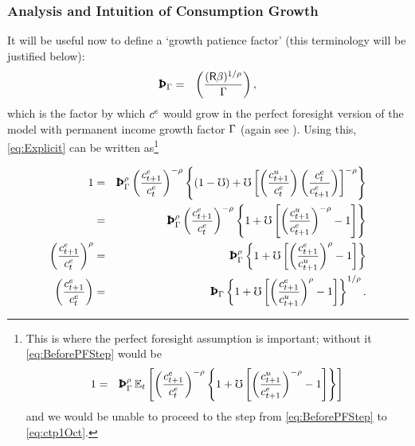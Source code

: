 \documentclass{handout}
\begin{document}
\subsubsection{Analysis and Intuition of Consumption Growth}
It will be useful now to define a `growth patience factor' (this terminology will be justified below):
\begin{eqnarray}
  \PatPGro & = & \left(\frac{(\Rfree\Discount)^{1/\CRRA}}{\PGro}\right), \label{eq:PatPGro}
\end{eqnarray}
which is the factor by which $c^{e}$ would grow in the
perfect foresight version of the model with permanent income growth factor
$\Gamma$ (again see ).  
Using this,
\eqref{eq:Explicit} can be written as\footnote{This is where the perfect foresight assumption is important; without it \eqref{eq:BeforePFStep} would be 
\begin{eqnarray}
 1       & = & \PatPGro^{\CRRA} \Ex_{t}\left[\left(\frac{\cRatE_{t+1}}{\cRatE_{t}}\right)^{-\CRRA} \left\{1+\urate\left[\left(\frac{\cU_{t+1}}{\cRatE_{t+1}}\right)^{-\CRRA}-1\right]\right\}\right] \label{eq:BeforePFStepWithEx}
\end{eqnarray}
and we would be unable to proceed to the step from \eqref{eq:BeforePFStep} to \eqref{eq:ctp1Oct}.}

\begin{eqnarray}
        1  & = & \PatPGro^{\CRRA} \left(\frac{\cRatE_{t+1}}{\cRatE_{t}}\right)^{-\CRRA} \left\{(1-\urate)+\urate\left[\left(\frac{\cU_{t+1}}{\cRatE_{t}}\right)\left(\frac{\cRatE_{t}}{\cRatE_{t+1}}\right)\right]^{-\CRRA}\right\}
\\       & = & \PatPGro^{\CRRA} \left(\frac{\cRatE_{t+1}}{\cRatE_{t}}\right)^{-\CRRA} \left\{1+\urate\left[\left(\frac{\cU_{t+1}}{\cRatE_{t+1}}\right)^{-\CRRA}-1\right]\right\} \label{eq:BeforePFStep}
\\       \left(\frac{\cRatE_{t+1}}{\cRatE_{t}}\right)^{\CRRA} & = & \PatPGro^{\CRRA} \left\{1+\urate\left[\left(\frac{\cRatE_{t+1}}{\cU_{t+1}}\right)^{\CRRA}-1\right]\right\} \label{eq:ctp1Oct}
\\       \left(\frac{\cRatE_{t+1}}{\cRatE_{t}}\right) & = & {\PatPGro} \left\{1+\urate\left[\left(\frac{\cRatE_{t+1}}{\cU_{t+1}}\right)^{\CRRA}-1\right]\right\}^{1/\CRRA}. \label{eq:cedel}
\end{eqnarray}

\end{document}
